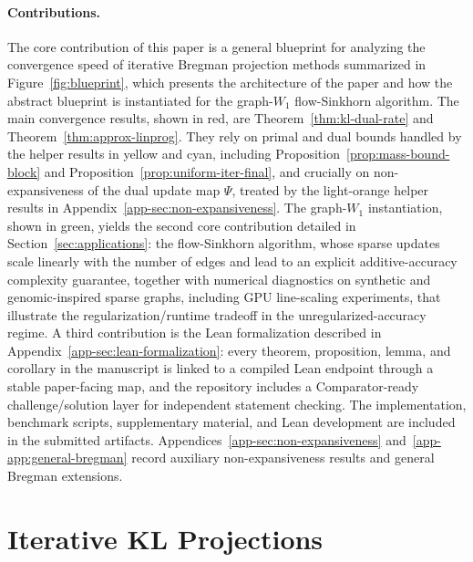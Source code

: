 \documentclass{article}
\theoremstyle{plain}
\begin{document}
\paragraph{Contributions.}
The core contribution of this paper is a general blueprint for analyzing the convergence speed of iterative Bregman projection methods summarized in Figure~\ref{fig:blueprint}, which presents the architecture of the paper and how the abstract blueprint is instantiated for the graph-$W_1$ flow-Sinkhorn algorithm. The main convergence results, shown in red, are Theorem~\ref{thm:kl-dual-rate} and Theorem~\ref{thm:approx-linprog}. They rely on primal and dual bounds handled by the helper results in yellow and cyan, including Proposition~\ref{prop:mass-bound-block} and Proposition~\ref{prop:uniform-iter-final}, and crucially on non-expansiveness of the dual update map $\Psi$, treated by the light-orange helper results in Appendix~\ref{app-sec:non-expansiveness}. The graph-$W_1$ instantiation, shown in green, yields the second core contribution detailed in Section~\ref{sec:applications}: the flow-Sinkhorn algorithm, whose sparse updates scale linearly with the number of edges and lead to an explicit additive-accuracy complexity guarantee, together with numerical diagnostics on synthetic and genomic-inspired sparse graphs, including GPU line-scaling experiments, that illustrate the regularization/runtime tradeoff in the unregularized-accuracy regime. A third contribution is the Lean formalization described in Appendix~\ref{app-sec:lean-formalization}: every theorem, proposition, lemma, and corollary in the manuscript is linked to a compiled Lean endpoint through a stable paper-facing map, and the repository includes a Comparator-ready challenge/solution layer for independent statement checking. The implementation, benchmark scripts, supplementary material, and Lean development are included in the submitted artifacts.
%
Appendices~\ref{app-sec:non-expansiveness} and~\ref{app-app:general-bregman} record auxiliary non-expansiveness results and general Bregman extensions.


\section{Iterative KL Projections}
\label{sec:general-KL-new}
\end{document}
